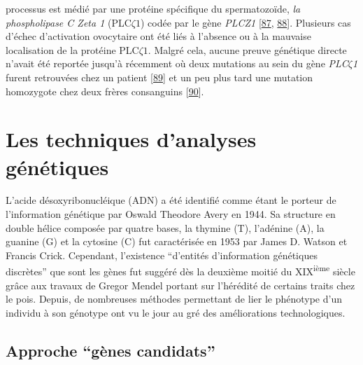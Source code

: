 \documentclass[12pt,a4paper,twoside]{ugathesis}
\theoremstyle{definition}
\theoremstyle{definition}
\theoremstyle{definition}
\theoremstyle{remark}
\begin{document}
\begin{enumerate}
  processus est médié par une protéine spécifique du spermatozoïde,
  \emph{la phospholipase C Zeta 1} (PLC\(\zeta 1\)) codée par le gène
  \emph{PLCZ1} {[}\protect\hyperlink{ref-Nomikos2013}{87},
  \protect\hyperlink{ref-Amdani2013}{88}{]}. Plusieurs cas d'échec
  d'activation ovocytaire ont été liés à l'absence ou à la mauvaise
  localisation de la protéine PLC\(\zeta1\). Malgré cela, aucune preuve
  génétique directe n'avait été reportée jusqu'à récemment où deux
  mutations au sein du gène \emph{PLC}\(\zeta\)\emph{1} furent
  retrouvées chez un patient
  {[}\protect\hyperlink{ref-Heytens2009}{89}{]} et un peu plus tard une
  mutation homozygote chez deux frères consanguins
  {[}\protect\hyperlink{ref-Escoffier2016}{90}{]}.
\end{enumerate}

\newpage  

\section{Les techniques d'analyses
génétiques}\label{les-techniques-danalyses-genetiques}

L'acide désoxyribonucléique (ADN) a été identifié comme étant le porteur
de l'information génétique par Oswald Theodore Avery en 1944. Sa
structure en double hélice composée par quatre bases, la thymine (T),
l'adénine (A), la guanine (G) et la cytosine (C) fut caractérisée en
1953 par James D. Watson et Francis Crick. Cependant, l'existence
``d'entités d'information génétiques discrètes'' que sont les gènes fut
suggéré dès la deuxième moitié du XIX\textsuperscript{ième} siècle grâce
aux travaux de Gregor Mendel portant sur l'hérédité de certains traits
chez le pois. Depuis, de nombreuses méthodes permettant de lier le
phénotype d'un individu à son génotype ont vu le jour au gré des
améliorations technologiques.

\subsection{\texorpdfstring{Approche ``gènes
candidats''}{Approche gènes candidats}}\label{approche-genes-candidats}
\end{document}
